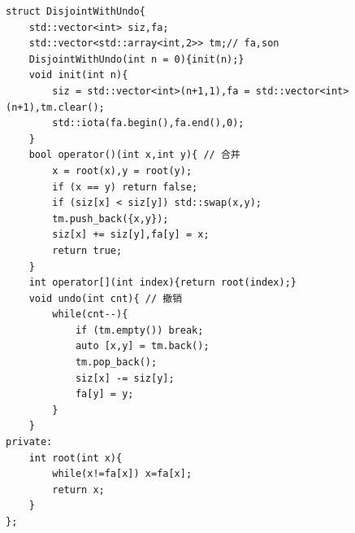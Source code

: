 \begin{lstlisting}
struct DisjointWithUndo{
    std::vector<int> siz,fa;
    std::vector<std::array<int,2>> tm;// fa,son
    DisjointWithUndo(int n = 0){init(n);}
    void init(int n){
        siz = std::vector<int>(n+1,1),fa = std::vector<int>(n+1),tm.clear();
        std::iota(fa.begin(),fa.end(),0);
    }
    bool operator()(int x,int y){ // 合并
        x = root(x),y = root(y);
        if (x == y) return false;
        if (siz[x] < siz[y]) std::swap(x,y);
        tm.push_back({x,y});
        siz[x] += siz[y],fa[y] = x;
        return true;
    }
    int operator[](int index){return root(index);}
    void undo(int cnt){ // 撤销
        while(cnt--){
            if (tm.empty()) break;
            auto [x,y] = tm.back();
            tm.pop_back();
            siz[x] -= siz[y];
            fa[y] = y;
        }
    }
private:
    int root(int x){
        while(x!=fa[x]) x=fa[x];
        return x;
    }
};
\end{lstlisting}